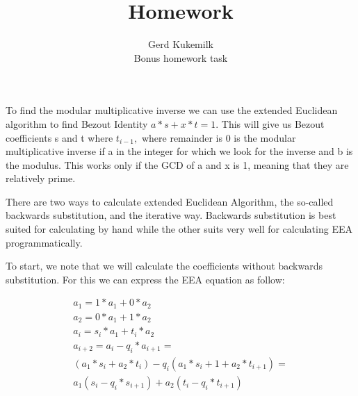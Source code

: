 \documentclass[12pt]{article}
\begin{document}


\title{Homework}%
\author{Gerd Kukemilk\\ %
Bonus homework task} %

\maketitle


To find the modular multiplicative inverse we can use the extended Euclidean algorithm to find Bezout Identity \(a*s + x*t = 1\). This will give us Bezout coefficients s and t where \(t_{i-1}, \) where remainder is 0 is the modular multiplicative inverse if a in the integer for which we look for the inverse and b is the modulus. This works only if the GCD of a and x is 1, meaning that they are relatively prime.

There are two ways to calculate extended Euclidean Algorithm, the so-called backwards substitution, and the iterative way. Backwards substitution is best suited for calculating by hand while the other suits very well for calculating EEA programmatically.

To start, we note that we will calculate the coefficients without backwards substitution. For this we can express the EEA equation as follow:

\begin{align*}
a_1 = 1 * a_1 + 0*a_2 \\
a_2 = 0 * a_1 + 1*a_2 \\
a_i = s_i*a_1 + t_i*a_2 \\
a_{i+2} = a_i - q_i*a_{i+1} = \\
(a_1*s_i+a_2*t_i) - q_i(a_1*s_i+1 + a_2*t_{i+1}) = \\
a_1(s_i-q_i*s_{i+1}) + a_2(t_i-q_i*t_{i+1}) \\
\\
\end{align*}
\end{document}
